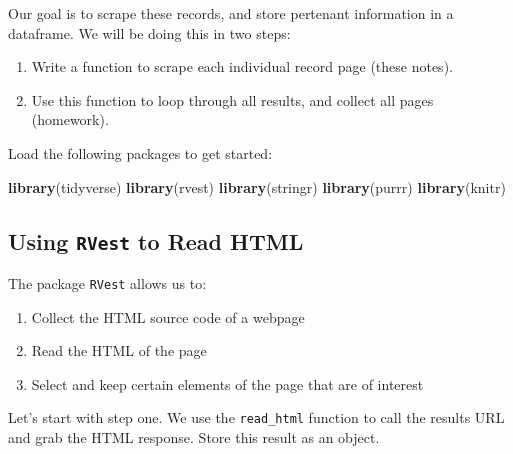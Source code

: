 \documentclass[]{book}
\newenvironment{Shaded}{\begin{snugshade}}{\end{snugshade}}
\newcommand{\KeywordTok}[1]{\textcolor[rgb]{0.13,0.29,0.53}{\textbf{#1}}}
\newcommand{\NormalTok}[1]{#1}
\providecommand{\tightlist}{%
  \setlength{\itemsep}{0pt}\setlength{\parskip}{0pt}}
\begin{document}
Our goal is to scrape these records, and store pertenant information in a dataframe. We will be doing this in two steps:

\begin{enumerate}
\def\labelenumi{\arabic{enumi}.}
\tightlist
\item
  Write a function to scrape each individual record page (these notes).
\item
  Use this function to loop through all results, and collect all pages (homework).
\end{enumerate}

Load the following packages to get started:

\begin{Shaded}
\begin{Highlighting}[]
\KeywordTok{library}\NormalTok{(tidyverse)}
\KeywordTok{library}\NormalTok{(rvest)}
\KeywordTok{library}\NormalTok{(stringr)}
\KeywordTok{library}\NormalTok{(purrr)}
\KeywordTok{library}\NormalTok{(knitr)}
\end{Highlighting}
\end{Shaded}

\hypertarget{using-rvest-to-read-html}{%
\subsection{\texorpdfstring{Using \texttt{RVest} to Read HTML}{Using RVest to Read HTML}}\label{using-rvest-to-read-html}}

The package \texttt{RVest} allows us to:

\begin{enumerate}
\def\labelenumi{\arabic{enumi}.}
\tightlist
\item
  Collect the HTML source code of a webpage
\item
  Read the HTML of the page
\item
  Select and keep certain elements of the page that are of interest
\end{enumerate}

Let's start with step one. We use the \texttt{read\_html} function to call the results URL and grab the HTML response. Store this result as an object.
\end{document}
